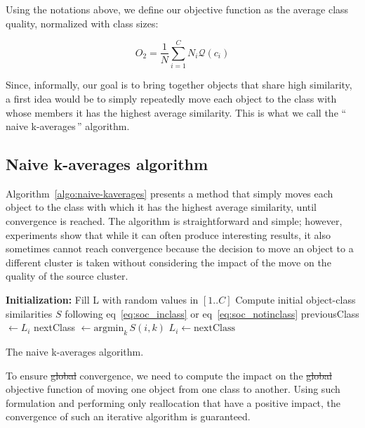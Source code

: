 \documentclass[natbib,smallextended]{svjour3}
\newcommand{\gl}[1]{``\,#1\,''} %
\providecommand{\DIFdeltex}[1]{{\protect\color{red}\sout{#1}}}                      %
\providecommand{\DIFdelbegin}{} %
\providecommand{\DIFdelend}{} %
\providecommand{\DIFdel}[1]{\texorpdfstring{\DIFdeltex{#1}}{}} %
\begin{document}
\DIFdelend Using the notations above, we define our objective function as the average class quality, normalized with class sizes:

\[
O_2 = \frac{1}{N} \sum_{i=1}^{C} N_i \mathcal{Q}(c_i)
\]

Since, informally, our goal is to bring together objects that share high similarity, a first idea would be to simply repeatedly move each object to the class with whose members it has the highest average similarity. This is what we call the \gl{naive k-averages} algorithm.

\subsection{Naive k-averages algorithm}

Algorithm~\ref{algo:naive-kaverages} presents a method that simply moves each object to the class with which it has the highest average similarity, until convergence is reached. The algorithm is straightforward and simple; however, experiments show that while it can often produce interesting results, it also sometimes cannot reach convergence because the decision to move an object to a different cluster is taken without considering the impact of the move on the quality of the source cluster.

\begin{algorithm}
	\label{algo:naive-kaverages}
	\SetAlgoLined
	\BlankLine
	\textbf{Initialization:}
		Fill L with random values in $[1..C]$\;
		Compute initial object-class similarities $S$ following eq~\ref{eq:soc_inclass} or eq~\ref{eq:soc_notinclass}\;
	\BlankLine
	 {
		 {
			previousClass $\leftarrow L_i$\;
			nextClass $\leftarrow \mathrm{argmin}_k\, S(i, k)$
			 {
				$L_i \leftarrow \mathrm{nextClass}$\;
			}
		}
	}
	\BlankLine
	\caption{The naive k-averages algorithm.}
\end{algorithm}

To ensure \DIFdelbegin \DIFdel{global }\DIFdelend convergence, we need to compute the impact on the \DIFdelbegin \DIFdel{global }\DIFdelend objective function of moving one object from one class to another. Using such formulation and performing only reallocation that have a positive impact, the convergence of such an iterative algorithm is guaranteed.
\end{document}
